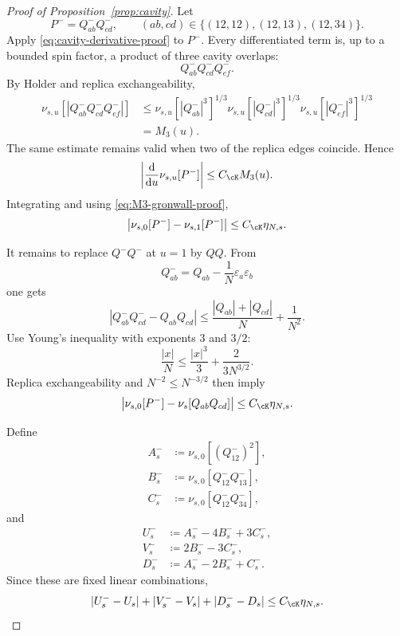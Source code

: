 \begin{proof}[Proof of Proposition~\ref{prop:cavity}]
Let
\[
 P^-=Q^-_{ab}Q^-_{cd},
 \qquad
 (ab,cd)\in
 \{(12,12),(12,13),(12,34)\}.
\]
Apply \eqref{eq:cavity-derivative-proof} to $P^-$.
Every differentiated term is, up to a bounded spin factor, a product of
three cavity overlaps:
\[
 Q^-_{ab}Q^-_{cd}Q^-_{ef}.
\]
By Holder and replica exchangeability,
\begin{align*}
 \nu_{s,u}
 \left[
 |Q^-_{ab}Q^-_{cd}Q^-_{ef}|
 \right]
 &\le
 \nu_{s,u}[|Q^-_{ab}|^3]^{1/3}
 \nu_{s,u}[|Q^-_{cd}|^3]^{1/3}
 \nu_{s,u}[|Q^-_{ef}|^3]^{1/3}\\
 &=M_3(u).
\end{align*}
The same estimate remains valid when two of the replica edges coincide.
Hence
\[
 \left|
 \frac{\mathrm d}{\mathrm du}\nu_{s,u}[P^-]
 \right|
 \le
 C_{\cK}M_3(u).
\]
Integrating and using \eqref{eq:M3-gronwall-proof},
\begin{equation}
 \left|
 \nu_{s,0}[P^-]-\nu_{s,1}[P^-]
 \right|
 \le C_{\cK}\eta_{N,s}.
 \label{eq:Pminus-endpoints}
\end{equation}

It remains to replace $Q^-Q^-$ at $u=1$ by $QQ$.
From
\[
 Q^-_{ab}
 =
 Q_{ab}-\frac1N\varepsilon_a\varepsilon_b
\]
one gets
\[
 \left|
 Q^-_{ab}Q^-_{cd}-Q_{ab}Q_{cd}
 \right|
 \le
 \frac{|Q_{ab}|+|Q_{cd}|}{N}
 +\frac1{N^2}.
\]
Use Young's inequality with exponents $3$ and $3/2$:
\begin{equation}
 \frac{|x|}{N}
 \le
 \frac{|x|^3}{3}
 +\frac{2}{3N^{3/2}}.
 \label{eq:young-cavity}
\end{equation}
Replica exchangeability and $N^{-2}\le N^{-3/2}$ then imply
\begin{equation}
 \left|
 \nu_{s,0}[P^-]-\nu_s[Q_{ab}Q_{cd}]
 \right|
 \le C_{\cK}\eta_{N,s}.
 \label{eq:endpoint-replacement-proof}
\end{equation}

Define
\begin{align*}
 A_s^-&\coloneqq\nu_{s,0}[(Q^-_{12})^2],\\
 B_s^-&\coloneqq\nu_{s,0}[Q^-_{12}Q^-_{13}],\\
 C_s^-&\coloneqq\nu_{s,0}[Q^-_{12}Q^-_{34}],
\end{align*}
and
\begin{align*}
 U_s^-&\coloneqq A_s^--4B_s^-+3C_s^-,\\
 V_s^-&\coloneqq2B_s^--3C_s^-,\\
 D_s^-&\coloneqq A_s^--2B_s^-+C_s^-.
\end{align*}
Since these are fixed linear combinations,
\begin{equation}
 |U_s^--U_s|
 +|V_s^--V_s|
 +|D_s^--D_s|
 \le
 C_{\cK}\eta_{N,s}.
 \label{eq:cavity-mode-replacement}
\end{equation}


\end{proof}
